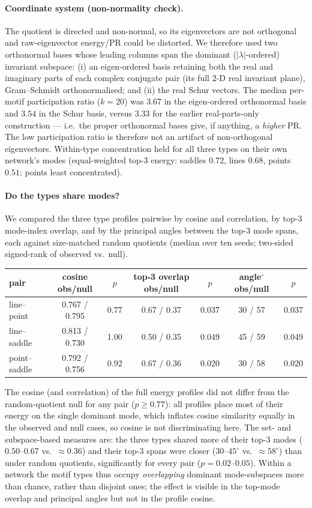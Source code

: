 \documentclass[11pt]{article}
\begin{document}
\paragraph{Coordinate system (non-normality check).} The quotient is directed and non-normal, so
its eigenvectors are not orthogonal and raw-eigenvector energy/PR could be distorted. We therefore
used two orthonormal bases whose leading columns span the dominant ($\lvert\lambda\rvert$-ordered)
invariant subspace: (i) an eigen-ordered basis retaining both the real and imaginary parts of each
complex conjugate pair (its full $2$-D real invariant plane), Gram--Schmidt orthonormalised; and
(ii) the real Schur vectors. The median per-motif participation ratio ($k=20$) was $3.67$ in the
eigen-ordered orthonormal basis and $3.54$ in the Schur basis, versus $3.33$ for the earlier
real-parts-only construction --- i.e.\ the proper orthonormal bases give, if anything, a
\emph{higher} PR. The low participation ratio is therefore not an artifact of non-orthogonal
eigenvectors. Within-type concentration held for all three types on their own network's modes
(equal-weighted top-3 energy: saddles $0.72$, lines $0.68$, points $0.51$; points least
concentrated).

\paragraph{Do the types share modes?} We compared the three type profiles pairwise by cosine and
correlation, by top-3 mode-index overlap, and by the principal angles between the top-3 mode spans,
each against size-matched random quotients (median over ten seeds; two-sided signed-rank of
observed vs.\ null).
\begin{center}\small
\begin{tabular}{lcccccc}
\toprule
pair & cosine obs/null & $p$ & top-3 overlap obs/null & $p$ & angle$^{\circ}$ obs/null & $p$ \\
\midrule
line--point   & 0.767 / 0.795 & 0.77 & 0.67 / 0.37 & 0.037 & 30 / 57 & 0.037 \\
line--saddle  & 0.813 / 0.730 & 1.00 & 0.50 / 0.35 & 0.049 & 45 / 59 & 0.049 \\
point--saddle & 0.792 / 0.756 & 0.92 & 0.67 / 0.36 & 0.020 & 30 / 58 & 0.020 \\
\bottomrule
\end{tabular}
\end{center}
The cosine (and correlation) of the full energy profiles did not differ from the random-quotient
null for any pair ($p\geq0.77$): all profiles place most of their energy on the single dominant
mode, which inflates cosine similarity equally in the observed and null cases, so cosine is not
discriminating here. The set- and subspace-based measures are: the three types shared more of their
top-3 modes ($0.50$--$0.67$ vs.\ $\approx0.36$) and their top-3 spans were closer ($30$--$45^{\circ}$
vs.\ $\approx58^{\circ}$) than under random quotients, significantly for every pair
($p=0.02$--$0.05$). Within a network the motif types thus occupy \emph{overlapping} dominant
mode-subspaces more than chance, rather than disjoint ones; the effect is visible in the top-mode
overlap and principal angles but not in the profile cosine.
\end{document}
